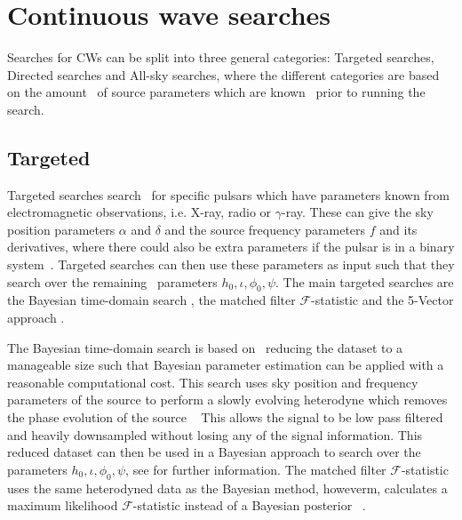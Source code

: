 \section{\label{searchcw:search} Continuous wave searches}

Searches for \glspl{CW} can be split into three general categories: Targeted
searches, Directed searches and All-sky searches, where the different
categories are based on the amount~ of source parameters which
are known~ prior to running the search.

\subsection{\label{searchcw:search:targeted}Targeted}

Targeted searches search~ for specific
pulsars which have parameters known from electromagnetic observations, i.e.
X-ray, radio or $\gamma$-ray.  These can give the sky position parameters
$\alpha$ and $\delta$ and the source frequency parameters $f$ and its
derivatives, where there could also be extra parameters if the pulsar is in a
binary system~.
Targeted searches can then use these parameters as input such that they search
over the remaining~ parameters $h_0, \iota, \phi_0, \psi$.  The
main targeted searches are the Bayesian time-domain search
\citep{dupuis2005BayesianEstimation}, the matched filter
$\mathcal{F}$-statistic \citep{schutz1998DataAnalysis} and the 5-Vector
approach \citep{astone2010MethodDetection}.

The Bayesian time-domain search is based on~ reducing the dataset to a manageable size such that Bayesian parameter
estimation can be applied with a reasonable computational cost.  This search
uses sky position and frequency parameters of the source to perform a slowly
evolving heterodyne which removes the phase evolution of the source
\citep{dupuis2005BayesianEstimation}~  This allows
the signal to be low pass filtered and heavily downsampled without losing any
of the signal information.  This reduced dataset can then be used in a Bayesian
approach to search over the parameters $h_0, \iota, \phi_0, \psi$, see
\citep{dupuis2005BayesianEstimation} for further information.  The matched
filter $\mathcal{F}$-statistic uses the same heterodyned data as the Bayesian
method, howeverm, calculates a maximum likelihood $\mathcal{F}$-statistic
instead of a Bayesian posterior
\citep{schutz1998DataAnalysis,prix2007SearchContinuous,
aasi2014GRAVITATIONALWAVES}~.

